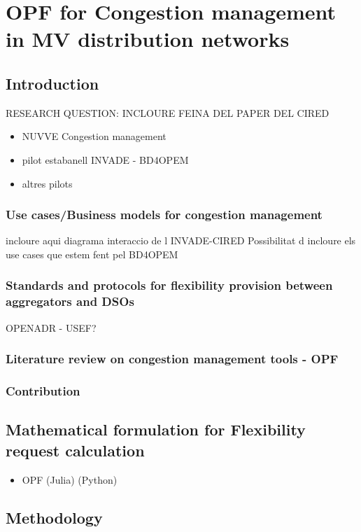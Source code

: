 \chapter{OPF for Congestion management in MV distribution networks}
\label{ChapterOPFDSO}

\section{Introduction}
RESEARCH QUESTION: INCLOURE FEINA DEL PAPER DEL CIRED
\begin{itemize}
\item NUVVE Congestion management
\item pilot estabanell INVADE - BD4OPEM 
\item altres pilots
\end{itemize}

\subsection{Use cases/Business models for congestion management}
incloure aqui diagrama interaccio de l INVADE-CIRED
Possibilitat d incloure els use cases que estem fent pel BD4OPEM 

\subsection{Standards and protocols for flexibility provision between aggregators and DSOs}
OPENADR - USEF? 
\subsection{Literature review on congestion management tools - OPF}
\subsection{Contribution}


\section{Mathematical formulation for Flexibility request calculation}
\begin{itemize}
	\item OPF (Julia) (Python)
\end{itemize}

\section{Methodology}
